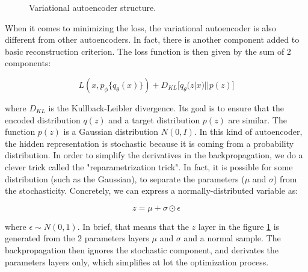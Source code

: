 \documentclass{article}
\def\layersep{2cm}
\begin{document}
\begin{figure}[h]
	\caption{Variational autoencoder structure.}
	\label{fig:VAEstructure}
\end{figure}

When it comes to minimizing the loss, the variational autoencoder is also different from other autoencoders. In fact, there is another component added to basic reconstruction criterion. The loss function is then given by the sum of 2 components:

$$
L(x, p_\phi\{q_\theta(x)\}) + D_{KL}\big[q_\theta(z|x) || p(z)\big]
$$

where $D_{KL}$ is the Kullback-Leibler divergence. Its goal is to ensure that the encoded distribution $q(z)$ and a target distribution $p(z)$ are similar. The function $p(z)$ is a Gaussian distribution $N(0, I)$. In this kind of autoencoder, the hidden representation is stochastic because it is coming from a probability distribution. In order to simplify the derivatives in the backpropagation, we do a clever trick called the "reparametrization trick". In fact, it is possible for some distribution (such as the Gaussian), to separate the parameters ($\mu$ and $\sigma$) from the stochasticity. Concretely, we can express a normally-distributed variable as:

$$
z = \mu + \sigma \odot \epsilon
$$

\noindent where $\epsilon \sim N(0,1)$. In brief, that means that the $z$ layer in the figure \ref{fig:VAEstructure} is generated from the 2 parameters layers $\mu$ and $\sigma$ and a normal sample. The backpropagation then ignores the stochastic component, and derivates the parameters layers only, which simplifies at lot the optimization process.
\end{document}
